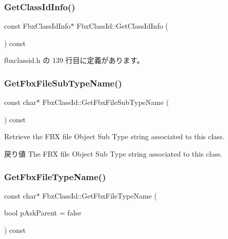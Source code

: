 \mbox{\label{class_fbx_class_id_ab773eed6b02a90514547cff07b1a7e24}} 
\subsubsection{\texorpdfstring{Get\+Class\+Id\+Info()}{GetClassIdInfo()}\hspace{0.1cm}{\footnotesize\ttfamily [2/2]}}
{\footnotesize\ttfamily const Fbx\+Class\+Id\+Info$\ast$ Fbx\+Class\+Id\+::\+Get\+Class\+Id\+Info (\begin{DoxyParamCaption}{ }\end{DoxyParamCaption}) const\hspace{0.3cm}{\ttfamily [inline]}}



 fbxclassid.\+h の 139 行目に定義があります。

\mbox{\label{class_fbx_class_id_a2aa9a15c83252c28a9ffd01366e9348b}} 
\subsubsection{\texorpdfstring{Get\+Fbx\+File\+Sub\+Type\+Name()}{GetFbxFileSubTypeName()}}
{\footnotesize\ttfamily const char$\ast$ Fbx\+Class\+Id\+::\+Get\+Fbx\+File\+Sub\+Type\+Name (\begin{DoxyParamCaption}{ }\end{DoxyParamCaption}) const}

Retrieve the F\+BX file Object Sub Type string associated to this class. \begin{DoxyReturn}{戻り値}
The F\+BX file Object Sub Type string associated to this class. 
\end{DoxyReturn}
\mbox{\label{class_fbx_class_id_ac1cca09d096f3f65f6df0f03d4ce7e39}} 
\subsubsection{\texorpdfstring{Get\+Fbx\+File\+Type\+Name()}{GetFbxFileTypeName()}}
{\footnotesize\ttfamily const char$\ast$ Fbx\+Class\+Id\+::\+Get\+Fbx\+File\+Type\+Name (\begin{DoxyParamCaption}\item[{bool}]{p\+Ask\+Parent = {\ttfamily false} }\end{DoxyParamCaption}) const}

